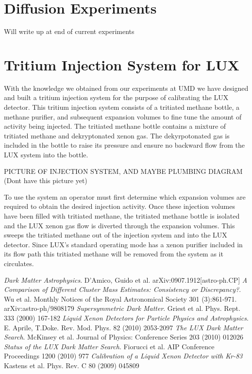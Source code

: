 \documentclass[a4paper,12pt]{article}
\begin{document}
\section{Diffusion Experiments}

Will write up at end of current experiments

\section{Tritium Injection System for LUX}

With the knowledge we obtained from our experiments at UMD we have designed and built a tritium injection system for the purpose of calibrating the LUX detector.  This tritium injection system consists of a tritiated methane bottle, a methane purifier, and subsequent expansion volumes to fine tune the amount of activity being injected.  The tritiated methane bottle contains a mixture of tritiated methane and dekryptonated xenon gas.  The dekyrpotonated gas is included in the bottle to raise its pressure and ensure no backward flow from the LUX system into the bottle.

PICTURE OF INJECTION SYSTEM, AND MAYBE PLUMBING DIAGRAM (Dont have this picture yet)

To use the system an operator must first determine which expansion volumes are required to obtain the desired injection activity.  Once these injection volumes have been filled with tritiated methane, the tritiated methane bottle is isolated and the LUX xenon gas flow is diverted through the expansion volumes.  This sweeps the tritiated methane out of the injection system and into the LUX detector.  Since LUX's standard operating mode has a xenon purifier included in its flow path this tritiated methane will be removed from the system as it circulates. 

\begin{thebibliography}{1}

 \emph{Dark Matter Astrophysics}. D'Amico, Guido et al. arXiv:0907.1912[astro-ph.CP] 
 \emph{A Comparison of Different Cluster Mass Estimates: Consistency or Discrepancy?}. Wu et al.  Monthly Notices of the Royal Astronomical Society 301 (3):861-971.  arXiv:astro-ph/9808179
 \emph{Supersymmetric Dark Matter}.  Griest et al.  Phys. Rept. 333 (2000) 167-182
 \emph{Liquid Xenon Detectors for Particle Physics and Astrophysics}.  E. Aprile, T.Doke. Rev. Mod. Phys. 82 (2010) 2053-2097
 \emph{The LUX Dark Matter Search}.  McKinsey et al.  Journal of Physics: Conference Series 203 (2010) 012026
 \emph{Status of the LUX Dark Matter Search}. Fiorucci et al.  AIP Conference Proceedings 1200 (2010) 977
 \emph{Calibration of a Liquid Xenon Detector with Kr-83} Kastens et al. Phys. Rev. C 80 (2009) 045809


\end{thebibliography}
\end{document}
